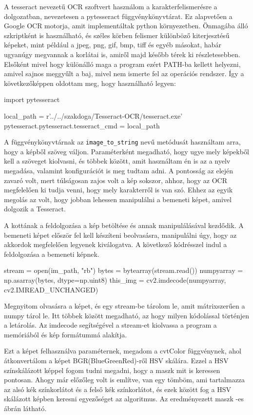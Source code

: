 A tesseract nevezetű OCR szoftvert használom a karakterfelismerésre a dolgozatban, nevezetesen a pytesseract függvénykönyvtárat. Ez alapvetően a Google OCR motorja, amit implementáltak python környezetben. Önmagába álló szkriptként is használható, és széles körben felismer különböző kiterjesztésű képeket, mint például a jpeg, png, gif, bmp, tiff és egyéb másokat, habár ugyanúgy megvannak a korlátai is, amiről majd később térek ki részletesebben. Elsőként mivel hogy különálló maga a program ezért PATH-ba kellett helyezni, amivel sajnos meggyűlt a baj, mivel nem ismerte fel az operációs rendszer. Így a következőképpen oldottam meg, hogy használható legyen:
\begin{python}
import pytesseract

local_path = r'../../szakdoga/Tesseract-OCR/tesseract.exe'
pytesseract.pytesseract.tesseract_cmd = local_path
\end{python}
A függvénykönyvtárnak az \texttt{image\_to\_string} nevű metódusát használtam arra, hogy a képből szöveg váljon. Paraméterként megadható, hogy ugye mely képekből kell a szöveget kiolvasni, és többek között, amit használtam én is az a nyelv megadása, valamint konfigurációt is meg tudtam adni. A pontosság az elején zavaró volt, mert túlságosan zajos volt a kép sokszor, ahhoz, hogy az OCR megfelelően ki tudja venni, hogy mely karakterről is van szó. Ehhez az egyik megolás az volt, hogy jobban lehessen manipulálni a bemeneti képet, amivel dolgozik a Tesseract.


A kottának a feldolgozása a kép betöltése és annak manipulálásával kezdődik. A bemeneti képet először fel kell készíteni beolvasásra, manipulálni úgy, hogy az akkordok megfelelően legyenek kiválogatva. A következő kódrésszel indul a feldolgozása a bemeneti képnek.

\begin{python}
stream = open(im_path, "rb")
bytes = bytearray(stream.read())
numpyarray = np.asarray(bytes, dtype=np.uint8)
this_img = cv2.imdecode(numpyarray, cv2.IMREAD_UNCHANGED)
\end{python}
Megnyitom olvasásra a képet, és egy stream-be tárolom le, amit mátrixszerűen a numpy tárol le. Itt többek között megadható, az hogy milyen kódolással történjen a letárolás. Az imdecode segítségével a stream-et kiolvassa a program a memóriából és kép formátummá alakítja.

Ezt a képet felhasználva paraméternek, megadom a cvtColor függvénynek, ahol átkonvertálom a képet BGR(BlueGreenRed)-ről HSV skálára. Ezzel a HSV színskálázott képpel fogom tudni megadni, hogy a maszk mit is keressen pontosan. Ahogy már előzőleg volt is említve, van egy tömböm, ami tartalmazza az alsó kék színkorlátot és a felső kék színkorlátot, és ezek között fog a HSV skálázott képben keresni egyezőséget az algoritmus. Az eredményezett maszk -es ábrán látható. 

